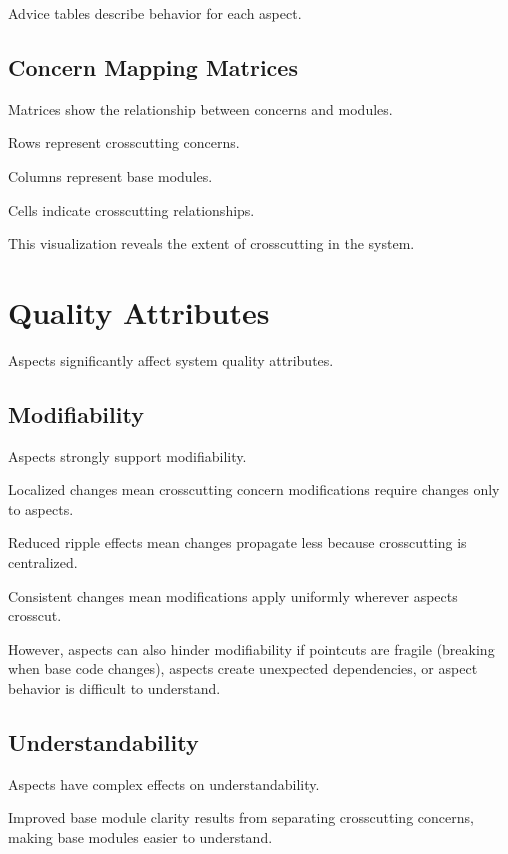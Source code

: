 \documentclass[11pt]{article}
\begin{document}
Advice tables describe behavior for each aspect.

\subsection{Concern Mapping Matrices}

Matrices show the relationship between concerns and modules.

Rows represent crosscutting concerns.

Columns represent base modules.

Cells indicate crosscutting relationships.

This visualization reveals the extent of crosscutting in the system.

\section{Quality Attributes}

Aspects significantly affect system quality attributes.

\subsection{Modifiability}

Aspects strongly support modifiability.

Localized changes mean crosscutting concern modifications require changes only to aspects.

Reduced ripple effects mean changes propagate less because crosscutting is centralized.

Consistent changes mean modifications apply uniformly wherever aspects crosscut.

However, aspects can also hinder modifiability if pointcuts are fragile (breaking when base code changes), aspects create unexpected dependencies, or aspect behavior is difficult to understand.

\subsection{Understandability}

Aspects have complex effects on understandability.

Improved base module clarity results from separating crosscutting concerns, making base modules easier to understand.
\end{document}
